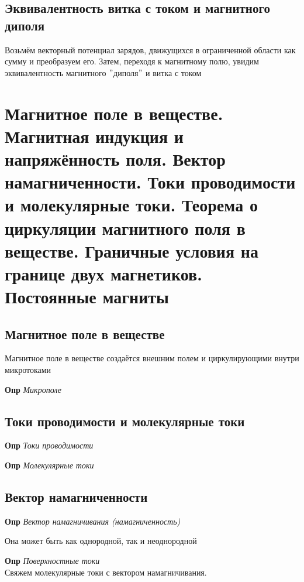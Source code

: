 \documentclass[a4paper, 14pt]{article}
\begin{document}
    \subsection{Эквивалентность витка с током и магнитного диполя}
    
    Возьмём векторный потенциал зарядов, движущихся в ограниченной области как сумму и преобразуем его.
    Затем, переходя к магнитному полю, увидим эквивалентность магнитного \("\)диполя\("\) и витка с током
    
    \section{Магнитное поле в веществе.
    Магнитная индукция и напряжённость поля.
    Вектор намагниченности.
    Токи проводимости и молекулярные токи.
    Теорема о циркуляции магнитного поля в веществе.
    Граничные условия на границе двух магнетиков.
    Постоянные магниты}
    
    \subsection{Магнитное поле в веществе}
    
    Магнитное поле в веществе создаётся внешним полем и циркулирующими внутри микротоками
    
    \textbf{Опр} \textit{Микрополе}
    
    \subsection{Токи проводимости и молекулярные токи}
    
    \textbf{Опр} \textit{Токи проводимости}
    
    \textbf{Опр} \textit{Молекулярные токи}
    
    \subsection{Вектор намагниченности}
    
    \textbf{Опр} \textit{Вектор намагничивания (намагниченность)}
    
    Она может быть как однородной, так и неоднородной
    
    \textbf{Опр} \textit{Поверхностные токи} \\
    
    Свяжем молекулярные токи с вектором намагничивания.
    
\end{document}

